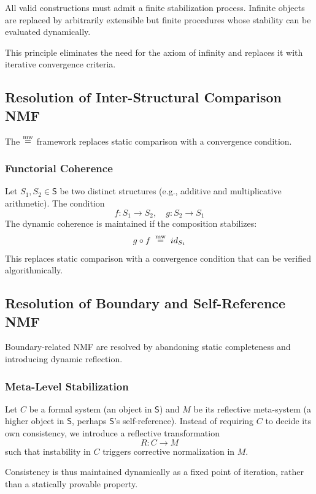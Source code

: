 \documentclass[11pt]{article}
\newcommand{\Sg}{\mathsf{S}} %
\begin{document}
\begin{principle}
All valid constructions must admit a finite stabilization process.
Infinite objects are replaced by arbitrarily extensible but finite
procedures whose stability can be evaluated dynamically.
\end{principle}

This principle eliminates the need for the axiom of infinity and
replaces it with iterative convergence criteria.

\subsection{Resolution of Inter-Structural Comparison NMF}

The $\mathrel{\overset{\mathrm{mw}}{=}}$ framework replaces static comparison with a convergence condition.

\subsubsection{Functorial Coherence}

Let $S_1, S_2 \in \Sg$ be two distinct structures (e.g., additive and
multiplicative arithmetic).
The condition
\[
f : S_1 \rightarrow S_2, \quad g : S_2 \rightarrow S_1
\]
The dynamic coherence is maintained if the composition stabilizes:
\[
g \circ f \; \mathrel{\overset{\mathrm{mw}}{=}} \; id_{S_1}
\]
This replaces static comparison with a convergence condition that can
be verified algorithmically.

\subsection{Resolution of Boundary and Self-Reference NMF}

Boundary-related NMF are resolved by abandoning static completeness and
introducing dynamic reflection.

\subsubsection{Meta-Level Stabilization}

Let $C$ be a formal system (an object in $\Sg$) and $M$ be its
reflective meta-system (a higher object in $\Sg$, perhaps $\Sg$'s self-reference).
Instead of requiring $C$ to decide its own consistency, we introduce
a reflective transformation
\[
R : C \rightarrow M
\]
such that instability in $C$ triggers corrective normalization in $M$.

Consistency is thus maintained dynamically as a fixed point of
iteration, rather than a statically provable property.
\end{document}
